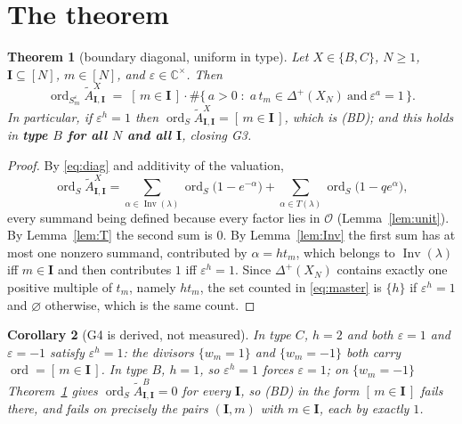 \documentclass[11pt]{article}
\newtheorem{thm}{Theorem}
\newtheorem{cor}[thm]{Corollary}
\theoremstyle{definition}
\theoremstyle{remark}
\DeclareMathOperator{\Inv}{Inv}
\DeclareMathOperator{\ord}{ord}
\newcommand{\At}{\widetilde{A}}
\newcommand{\bI}{\mathbf{I}}
\begin{document}
\section{The theorem}

\begin{thm}[boundary diagonal, uniform in type]\label{thm:BD}
Let $X\in\{B,C\}$, $N\ge1$, $\bI\subseteq[N]$, $m\in[N]$, and
$\varepsilon\in\mathbb{C}^{\times}$.  Then
\begin{equation}
  \ord_{S^{\varepsilon}_m}\At^{X}_{\bI,\bI}
  \;=\;[\,m\in\bI\,]\cdot
  \#\bigl\{\,a>0 \;:\; a\,t_m\in\Delta^{+}(X_N)\ \text{and}\ \varepsilon^{a}=1\,\bigr\}.
  \label{eq:master}
\end{equation}
In particular, if $\varepsilon^{h}=1$ then $\ord_S\At^{X}_{\bI,\bI}=[\,m\in\bI\,]$,
which is \textup{(BD)}; and this holds in \textbf{type $B$ for all $N$ and all $\bI$},
closing \textup{G3}.
\end{thm}

\begin{proof}
By \eqref{eq:diag} and additivity of the valuation,
\[
  \ord_S\At^{X}_{\bI,\bI}
  =\sum_{\alpha\in\Inv(\lambda)}\ord_S\bigl(1-e^{-\alpha}\bigr)
  +\sum_{\alpha\in T(\lambda)}\ord_S\bigl(1-qe^{\alpha}\bigr),
\]
every summand being defined because every factor lies in $\mathcal{O}$
(Lemma~\ref{lem:unit}).  By Lemma~\ref{lem:T} the second sum is $0$.  By
Lemma~\ref{lem:Inv} the first sum has at most one nonzero summand, contributed by
$\alpha=h t_m$, which belongs to $\Inv(\lambda)$ iff $m\in\bI$ and then contributes
$1$ iff $\varepsilon^{h}=1$.  Since $\Delta^{+}(X_N)$ contains exactly one positive
multiple of $t_m$, namely $h t_m$, the set counted in \eqref{eq:master} is $\{h\}$ if
$\varepsilon^{h}=1$ and $\varnothing$ otherwise, which is the same count.
\end{proof}

\begin{cor}[G4 is derived, not measured]\label{cor:G4}
In type $C$, $h=2$ and both $\varepsilon=1$ and $\varepsilon=-1$ satisfy
$\varepsilon^{h}=1$: the divisors $\{w_m=1\}$ and $\{w_m=-1\}$ \emph{both} carry
$\ord=[\,m\in\bI\,]$.  In type $B$, $h=1$, so $\varepsilon^{h}=1$ forces
$\varepsilon=1$; on $\{w_m=-1\}$ Theorem~\ref{thm:BD} gives
$\ord_S\At^{B}_{\bI,\bI}=0$ for \emph{every} $\bI$, so \textup{(BD)} in the form
$[\,m\in\bI\,]$ fails there, and fails on \emph{precisely} the pairs $(\bI,m)$ with
$m\in\bI$, each by exactly $1$.
\end{cor}
\end{document}
